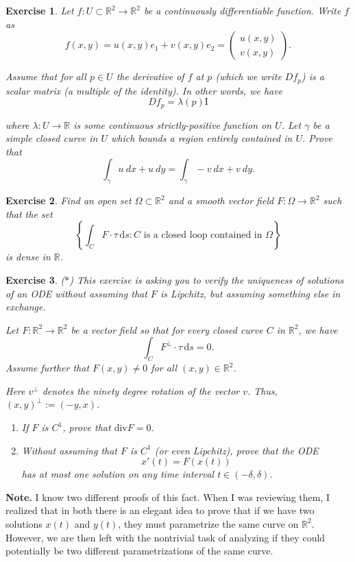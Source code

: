 \documentclass{article}
\newtheorem{q}{Exercise}
\newcommand{\R}{\mathbb R}
\newcommand{\dd}{\mathrm d}
\newcommand{\note}{\noindent \textbf{Note. }}
\begin{document}
\begin{q}
Let $f:U\subset\mathbb{R}^2\rightarrow\mathbb{R}^2$ be a continuously differentiable function. Write $f$ as
\begin{equation*}
f(x,y)=u(x,y)e_1+v(x,y)e_2=\begin{pmatrix}u(x,y) \\ v(x,y)\end{pmatrix}.
\end{equation*}

\noindent Assume that for all $p\in U$ the derivative of $f$ at $p$ (which we write $Df_p$) is a scalar matrix (a multiple of the identity). In other words, we have
\begin{equation*}
Df_p= \lambda(p) \mathrm{I}
\end{equation*}

\noindent where $\lambda:U\rightarrow\mathbb{R}$ is some continuous strictly-positive function on $U$. Let $\gamma$ be a simple closed curve in $U$ which bounds a region entirely contained in $U$. Prove that
\begin{equation*}
\int_\gamma u\:dx+u\:dy=\int_\gamma-v\:dx+v\:dy.
\end{equation*}
\end{q}

\begin{q}
Find an open set $\Omega \subset \R^2$ and a smooth vector field $F :\Omega \to \R^2$ such that the set
\[ \left\{ \int_{C} F \cdot \tau \, \dd s : C \text{ is a closed loop contained in } \Omega \right\}\]
is dense in $\R$.
\end{q}

\begin{q}{\em($\ast$)}
This exercise is asking you to verify the uniqueness of solutions of an ODE without assuming that $F$ is Lipchitz, but assuming something else in exchange. 

Let $F : \R^2 \to \R^2$ be a vector field so that for every closed curve $C$ in $\R^2$, we have
\[ \int_C F^\perp \cdot \tau \, \dd s = 0.\]
Assume further that $F(x,y) \neq 0$ for all $(x,y) \in \R^2$.

Here $v^\perp$ denotes the ninety degree rotation of the vector $v$. Thus, $(x,y)^\perp := (-y,x)$.

\begin{enumerate}
	\item If $F$ is $C^1$, prove that $\mathrm{div } F = 0$.
	\item Without assuming that $F$ is $C^1$ (or even Lipchitz), prove that the ODE
	\[ x'(t) = F(x(t))\]
	has at most one solution on any time interval $t \in (-\delta,\delta)$.
\end{enumerate}
\end{q}
\note I know two different proofs of this fact. When I was reviewing them, I realized that in both there is an elegant idea to prove that if we have two solutions $x(t)$ and $y(t)$, they must parametrize the same curve on $\R^2$. However, we are then left with the nontrivial task of analyzing if they could potentially be two different parametrizations of the same curve.
\end{document}

